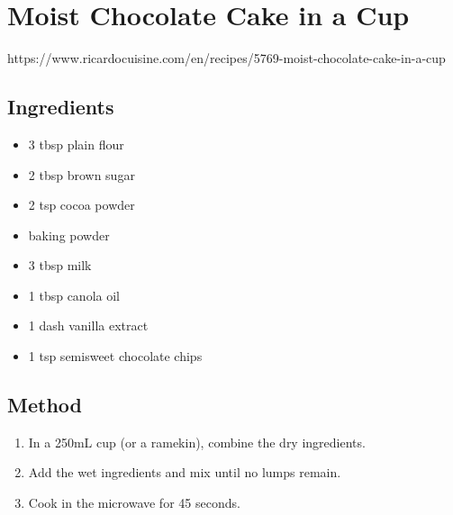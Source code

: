 \section{Moist Chocolate Cake in a Cup}
  https://www.ricardocuisine.com/en/recipes/5769-moist-chocolate-cake-in-a-cup
  \begin{multicols}{2}
    \subsection{Ingredients}
      \begin{itemize}
        \item 3 tbsp plain flour
        \item 2 tbsp brown sugar
        \item 2 tsp cocoa powder
        \item {} baking powder
        \item 3 tbsp milk
        \item 1 tbsp canola oil
        \item 1 dash vanilla extract
        \item 1 tsp semisweet chocolate chips
      \end{itemize}
  \vfill\null
  \columnbreak
  \subsection{Method}
    \begin{enumerate}
      \item In a 250mL cup (or a ramekin), combine the dry ingredients.
      \item Add the wet ingredients and mix until no lumps remain.
      \item Cook in the microwave for 45 seconds.
    \end{enumerate}
  \end{multicols}
